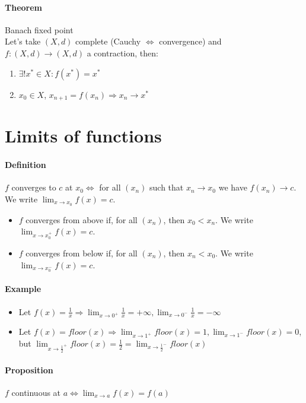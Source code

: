 \documentclass{article}
\newcommand{\DS}{\displaystyle}
\newcommand{\func}[3]{#1 : #2 \rightarrow #3}
\newcommand{\limx}[1]{\lim_{x \to #1}}
\newcommand{\Def}{\paragraph{Definition}}
\newcommand{\Proposition}{\paragraph{Proposition}}
\newcommand{\Theorem}{\paragraph{Theorem}}
\newcommand{\Example}{\paragraph{Example}}
\begin{document}
	\Theorem Banach fixed point
\\Let's take $(X,d)$ complete (Cauchy $\iff$ convergence) and
	$\func{f}{(X,d)}{(X,d)}$ a contraction, then:
	\begin{enumerate}[label=(\roman*)]
		\item $\exists! x^* \in X : f(x^*) = x^*$
		\item $x_0 \in X$, $x_{n+1} = f(x_n) \Rightarrow x_n \to x^*$
	\end{enumerate}

\section{Limits of functions}

	\Def $f$ converges to $c$ at $x_0 \iff$ for all $(x_n)$ such that $x_n \to x_0$
	we have $f(x_n) \to c$. We write $\DS \limx{x_0} f(x) = c$.
	\begin{itemize}
		\item $f$ converges from above if, for all $(x_n)$, then $x_0 < x_n$.
		We write $\DS \limx{x_0^+} f(x) = c$.
		\item $f$ converges from below if, for all $(x_n)$, then $x_n < x_0$.
		We write $\DS \limx{x_0^-} f(x) = c$.
	\end{itemize}

	\Example
	\begin{itemize}
		\item Let $\DS f(x) = \frac{1}{x} \Rightarrow \limx{0^+} \frac{1}{x} =
		+\infty, \limx{0^-} \frac{1}{x} = -\infty$
		\item Let $\DS f(x) = floor(x) \Rightarrow \limx{1^+} floor(x) = 1,
		\limx{1^-} floor(x) = 0$, but $\DS \limx{\frac{1}{2}^+} floor(x) =
		\frac{1}{2} = \limx{\frac{1}{2}^-} floor(x)$
	\end{itemize}

	\Proposition $f$ continuous at $a \iff \limx{a} f(x) = f(a)$
\end{document}
